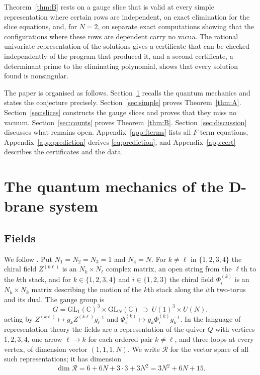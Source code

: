 \documentclass[11pt]{amsart}
\theoremstyle{definition}
\newcommand{\CC}{\mathbb{C}}
\newcommand{\cR}{\mathcal R}
\newcommand{\GL}{\mathrm{GL}}
\begin{document}
Theorem~\ref{thm:B} rests on a gauge slice that is valid at every simple representation where certain rows are independent, on exact elimination for the slice equations, and, for $N=2$, on separate exact computations showing that the configurations where these rows are dependent carry no vacua. The rational univariate representation of the solutions \cite{Rou99} gives a certificate that can be checked independently of the program that produced it, and a second certificate, a determinant prime to the eliminating polynomial, shows that every solution found is nonsingular.

The paper is organised as follows. Section~\ref{sec:system} recalls the quantum mechanics and states the conjecture precisely. Section~\ref{sec:simple} proves Theorem~\ref{thm:A}. Section~\ref{sec:slices} constructs the gauge slices and proves that they miss no vacuum. Section~\ref{sec:counts} proves Theorem~\ref{thm:B}. Section~\ref{sec:discussion} discusses what remains open. Appendix~\ref{app:fterms} lists all $F$-term equations, Appendix~\ref{app:prediction} derives \eqref{eq:prediction}, and Appendix~\ref{app:cert} describes the certificates and the data.

\section{The quantum mechanics of the D-brane system}\label{sec:system}

\subsection{Fields}
We follow \cite[Section~2]{CGMS16}. Put $N_1=N_2=N_3=1$ and $N_4=N$. For $k\ne\ell$ in $\{1,2,3,4\}$ the chiral field $Z^{(k\ell)}$ is an $N_k\times N_\ell$ complex matrix, an open string from the $\ell$th to the $k$th stack, and for $k\in\{1,2,3,4\}$ and $i\in\{1,2,3\}$ the chiral field $\Phi^{(k)}_i$ is an $N_k\times N_k$ matrix describing the motion of the $k$th stack along the $i$th two-torus and its dual. The gauge group is
\[
G=\GL_1(\CC)^3\times\GL_N(\CC)\ \supset\ U(1)^3\times U(N),
\]
acting by $Z^{(k\ell)}\mapsto g_kZ^{(k\ell)}g_\ell^{-1}$ and $\Phi^{(k)}_i\mapsto g_k\Phi^{(k)}_ig_k^{-1}$. In the language of representation theory the fields are a representation of the quiver $Q$ with vertices $1,2,3,4$, one arrow $\ell\to k$ for each ordered pair $k\ne\ell$, and three loops at every vertex, of dimension vector $(1,1,1,N)$. We write $\cR$ for the vector space of all such representations; it has dimension
\[
\dim\cR=6+6N+3\cdot3+3N^2=3N^2+6N+15 .
\]
\end{document}
